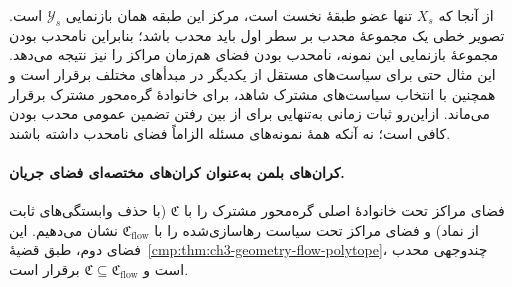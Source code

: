 از آنجا که $X_s$ تنها عضو طبقهٔ نخست است، مرکز این طبقه همان بازنمایی $\mathscr Y_s$ است. تصویر خطی یک مجموعهٔ محدب بر سطر اول باید محدب باشد؛ بنابراین نامحدب بودن مجموعهٔ بازنمایی این نمونه، نامحدب بودن فضای هم‌زمان مراکز را نیز نتیجه می‌دهد. این مثال حتی برای سیاست‌های مستقل از یکدیگر در مبدأهای مختلف برقرار است و همچنین با انتخاب سیاست‌های مشترک شاهد، برای خانوادهٔ گره‌محور مشترک برقرار می‌ماند. ازاین‌رو ثبات زمانی به‌تنهایی برای از بین رفتن تضمین عمومی محدب بودن کافی است؛ نه آنکه همهٔ نمونه‌های مسئله الزاماً فضای نامحدب داشته باشند.

\paragraph{کران‌های بلمن به‌عنوان کران‌های مختصه‌ای فضای جریان.}
فضای مراکز تحت خانوادهٔ اصلی گره‌محور مشترک را با $\mathfrak C$ (با حذف وابستگی‌های ثابت از نماد) و فضای مراکز تحت سیاست رهاسازی‌شده را با $\mathfrak C_{\mathrm{flow}}$ نشان می‌دهیم. این فضای دوم، طبق قضیهٔ~\ref{cmp:thm:ch3-geometry-flow-polytope}، چندوجهی محدب است و $\mathfrak C\subseteq\mathfrak C_{\mathrm{flow}}$ برقرار است.

